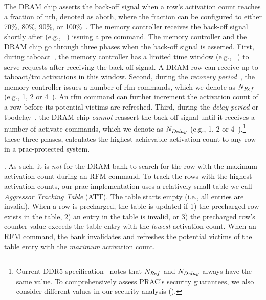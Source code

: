 The DRAM chip asserts the back-off signal when a row's activation count reaches a fraction of \gls{nrh}, denoted as \gls{aboth}, where the fraction can be configured to either 70\%, 80\%, 90\%, or 100\%~\cite{jedec2024jesd795c}.
The memory controller receives the back-off signal shortly after (e.g., ~\cite{jedec2024jesd795c}) issuing a \gls{pre} command.
The memory controller and the DRAM chip go through three phases when the back-off signal is asserted.
First, during \gls{taboact}~\cite{jedec2024jesd795c}, the memory controller has a limited time window (e.g., ~\cite{jedec2024jesd795c}) to serve requests after receiving the back-off signal.
A DRAM row can receive up to \gls{taboact}/\gls{trc} activations in this window.
Second, during the \emph{recovery period}~\cite{jedec2024jesd795c}, the memory controller issues a number of \gls{rfm} commands, which we denote as $N_{Ref}{}$ (e.g., 1, 2 or 4~\cite{jedec2024jesd795c}).
An \gls{rfm} command can further increment the activation count of a row before its potential victims are refreshed.
Third, during the \emph{delay period} or \gls{tbodelay}~\cite{jedec2024jesd795c}, the DRAM chip \emph{cannot} reassert the back-off signal until it receives a number of activate commands, which we denote as $N_{Delay}{}$  (e.g., 1, 2 or 4~\cite{jedec2024jesd795c}).\footnote{Current DDR5 specification~\cite{jedec2024jesd795c} notes that $N_{Ref}$ and $N_{Delay}$ always have the same value. To comprehensively assess PRAC's security guarantees, we also consider different values in our security analysis ().}
 these three phases,  calculates the highest achievable activation count to any row in a \gls{prac}-protected system.

.
As such, it is \emph{not}  for the DRAM bank to search for the row with the maximum activation count during an RFM command.
To track the rows with the highest activation counts, our \gls{prac} implementation uses a relatively small  table  we call  \emph{Aggressor Tracking Table} (ATT).
The table starts empty (i.e., all entries are invalid).
When a row is precharged, the table is updated  if
1) the precharged row exists in the table,
2) an entry in the table is invalid, or
3) the precharged row's counter value exceeds the table entry with the \emph{lowest} activation count.
When  an RFM command, the bank invalidates and refreshes the potential victims of the table entry with the \emph{maximum} activation count.

